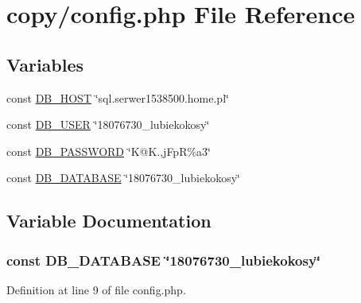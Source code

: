 \hypertarget{copy_2config_8php}{}\section{copy/config.php File Reference}
\label{copy_2config_8php}
\subsection*{Variables}
\begin{DoxyCompactItemize}
\item 
const \hyperlink{copy_2config_8php_a293363d7988627f671958e2d908c202a}{D\+B\+\_\+\+H\+O\+S\+T} \char`\"{}sql.\+serwer1538500.\+home.\+pl\char`\"{}
\item 
const \hyperlink{copy_2config_8php_a1d1d99f8e08f387d84fe9848f3357156}{D\+B\+\_\+\+U\+S\+E\+R} \char`\"{}18076730\+\_\+lubiekokosy\char`\"{}
\item 
const \hyperlink{copy_2config_8php_a4dca144fafcc7bd3f71cb5778afcdd13}{D\+B\+\_\+\+P\+A\+S\+S\+W\+O\+R\+D} \char`\"{}K@K.,j\+Fp\+R\%a3\char`\"{}
\item 
const \hyperlink{copy_2config_8php_a4798f8ff41893eb12308c2b638b8becf}{D\+B\+\_\+\+D\+A\+T\+A\+B\+A\+S\+E} \char`\"{}18076730\+\_\+lubiekokosy\char`\"{}
\end{DoxyCompactItemize}


\subsection{Variable Documentation}
\hypertarget{copy_2config_8php_a4798f8ff41893eb12308c2b638b8becf}{}
\subsubsection[{D\+B\+\_\+\+D\+A\+T\+A\+B\+A\+S\+E}]{\setlength{\rightskip}{0pt plus 5cm}const D\+B\+\_\+\+D\+A\+T\+A\+B\+A\+S\+E \char`\"{}18076730\+\_\+lubiekokosy\char`\"{}}\label{copy_2config_8php_a4798f8ff41893eb12308c2b638b8becf}


Definition at line 9 of file config.\+php.

\hypertarget{copy_2config_8php_a293363d7988627f671958e2d908c202a}{}
